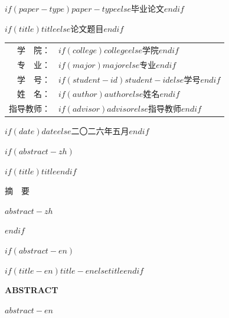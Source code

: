 \documentclass[UTF8,zihao=-4,linespread=1.0,twoside,scheme=chinese]{ctexrep}
\begin{document}
\begin{titlepage}
\centering
\vspace*{2.0cm}
{\heiti{} $if(paper-type)$$paper-type$$else$毕业论文$endif$ \par}
\vspace{0.8cm}
{\heiti{} $if(title)$$title$$else$论文题目$endif$ \par}
\vfill
{\songti{}
\begin{tabular}{rl}
学\ \ 院： & $if(college)$$college$$else$学院$endif$ \\
专\ \ 业： & $if(major)$$major$$else$专业$endif$ \\
学\ \ 号： & $if(student-id)$$student-id$$else$学号$endif$ \\
姓\ \ 名： & $if(author)$$author$$else$姓名$endif$ \\
指导教师： & $if(advisor)$$advisor$$else$指导教师$endif$ \\
\end{tabular}
\par}
\vspace{1.5cm}
{\songti{} $if(date)$$date$$else$二〇二六年五月$endif$ \par}
\end{titlepage}

\setcounter{page}{1}

$if(abstract-zh)$
\cleardoublepage
\begin{center}
{\heiti{} $if(title)$$title$$endif$ \par}
\vspace{20pt}
{\heiti{} 摘\ \ 要 \par}
\end{center}
\vspace{20pt}
$abstract-zh$

\vspace{20pt}
$endif$

$if(abstract-en)$
\cleardoublepage
\begin{center}
{\bfseries{} \MakeUppercase{$if(title-en)$$title-en$$else$$title$$endif$} \par}
\vspace{20pt}
{\bfseries{} ABSTRACT \par}
\end{center}
\vspace{20pt}
$abstract-en$
\end{document}
